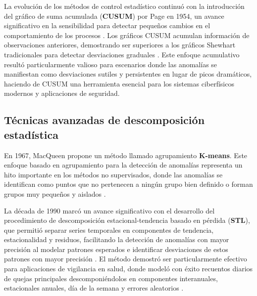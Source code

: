 La evolución de los métodos de control estadístico continuó con la introducción del gráfico de suma acumulada (\textbf{CUSUM}) por Page en 1954, un avance significativo en la sensibilidad para detectar pequeños cambios en el comportamiento de los procesos \cite{page_continuous_1954}. Los gráficos CUSUM acumulan información de observaciones anteriores, demostrando ser superiores a los gráficos Shewhart tradicionales para detectar desviaciones graduales \cite{gualandi_worst-case_2023,gualandi_optimization-based_2022}. Este enfoque acumulativo resultó particularmente valioso para escenarios donde las anomalías se manifiestan como desviaciones sutiles y persistentes en lugar de picos dramáticos, haciendo de CUSUM una herramienta esencial para los sistemas ciberfísicos modernos y aplicaciones de seguridad.


\subsection{Técnicas avanzadas de descomposición estadística}

En 1967, MacQueen  propone un método llamado  agrupamiento \textbf{K-means}. Este enfoque basado en agrupamiento para la detección de anomalías representa un hito importante en los métodos no supervisados, donde las anomalías se identifican como puntos que no pertenecen a ningún grupo bien definido o forman grupos muy pequeños y aislados \cite{morissette_k-means_2013}.

La década de 1990 marcó un avance significativo con el desarrollo del procedimiento de descomposición estacional-tendencia basado en pérdida (\textbf{STL}), que permitió separar series temporales en componentes de tendencia, estacionalidad y residuos, facilitando la detección de anomalías con mayor precisión al modelar patrones esperados e identificar desviaciones de estos patrones con mayor precisión \cite{cleveland_stl_1990}. El método demostró ser particularmente efectivo para aplicaciones de vigilancia en salud, donde modeló con éxito recuentos diarios de quejas principales descomponiéndolos en componentes interanuales, estacionales anuales, día de la semana y errores aleatorios \cite{hafen_syndromic_2009}. 
